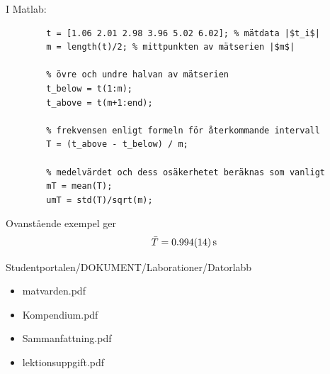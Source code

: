 \documentclass[9pt]{beamer}
\newcommand*\mean[1]{\bar{#1}}
\begin{document}
    \begin{frame}[fragile]
        I Matlab:
        \begin{verbatim}
        t = [1.06 2.01 2.98 3.96 5.02 6.02]; % mätdata |$t_i$|
        m = length(t)/2; % mittpunkten av mätserien |$m$|
        
        % övre och undre halvan av mätserien
        t_below = t(1:m);
        t_above = t(m+1:end);
        
        % frekvensen enligt formeln för återkommande intervall
        T = (t_above - t_below) / m;
        
        % medelvärdet och dess osäkerhetet beräknas som vanligt
        mT = mean(T);
        umT = std(T)/sqrt(m);
        \end{verbatim}

        \vfill
        Ovanstående exempel ger
        \begin{equation*}
            \mean{T} = \SI{0.994\pm0.014}{s}
        \end{equation*}
    \end{frame}









    \begin{frame}
        Studentportalen/DOKUMENT/Laborationer/Datorlabb
        \begin{itemize}
            \item matvarden.pdf
            \item Kompendium.pdf
            \item Sammanfattning.pdf
            \item lektionsuppgift.pdf
        \end{itemize}
    \end{frame}
\end{document}
